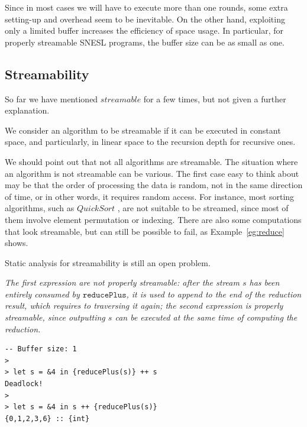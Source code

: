 Since in most cases we will have to execute more than one rounds, some extra setting-up and overhead seem to be inevitable.
On the other hand, exploiting only a limited buffer increases the efficiency of space usage. 
In particular, for properly streamable SNESL programs, the buffer size can be as small as one.


\subsection{Streamability}

So far we have mentioned $streamable$ for a few times, but not given a further explanation.

We consider an algorithm to be streamable if it can be executed in constant space, and particularly, in linear space to the recursion depth for recursive ones.

We should point out that not all algorithms are streamable. 
The situation where an algorithm is not streamable can be various.
The first case easy to think about may be that the order of processing the data is random, not in the same direction of time, or in other words, it requires random access.
For instance, most sorting algorithms, such as $QuickSort$ \cite{Hoare1961}, are not suitable to be streamed, since most of them involve element permutation or indexing. There are also some computations that look streamable, but can still be possible to fail, as Example~\ref{eg:reduce} shows.

Static analysis for streamability is still an open problem.

\begin{example}\label{eg:reduce}
	\emph{The first expression are not properly streamable: after the stream $s$ has been entirely consumed by $\mathtt{reducePlus}$, it is used to append to the end of the reduction result, which requires to traversing it again; the second expression is properly streamable, since outputting $s$ can be executed at the same time of computing the reduction.}
\end{example}
\begin{lstlisting}[style=nesl-style]
-- Buffer size: 1
>
> let s = &4 in {reducePlus(s)} ++ s
Deadlock!
>
> let s = &4 in s ++ {reducePlus(s)}
{0,1,2,3,6} :: {int}
\end{lstlisting}


